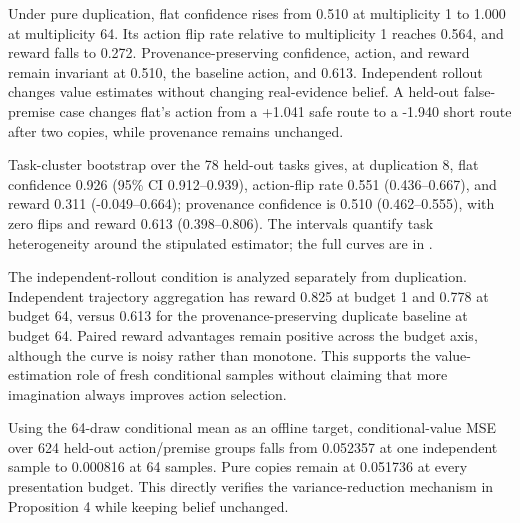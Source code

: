 \documentclass[10pt]{article}
\begin{document}
Under pure duplication, flat confidence rises from 0.510 at multiplicity 1 to 1.000 at multiplicity 64. Its action flip rate relative to multiplicity 1 reaches 0.564, and reward falls to 0.272. Provenance-preserving confidence, action, and reward remain invariant at 0.510, the baseline action, and 0.613. Independent rollout changes value estimates without changing real-evidence belief. A held-out false-premise case changes flat's action from a +1.041 safe route to a -1.940 short route after two copies, while provenance remains unchanged.

Task-cluster bootstrap over the 78 held-out tasks gives, at duplication 8, flat confidence 0.926 (95\% CI 0.912--0.939), action-flip rate 0.551 (0.436--0.667), and reward 0.311 (-0.049--0.664); provenance confidence is 0.510 (0.462--0.555), with zero flips and reward 0.613 (0.398--0.806). The intervals quantify task heterogeneity around the stipulated estimator; the full curves are in \texttt{}.

The independent-rollout condition is analyzed separately from duplication. Independent trajectory aggregation has reward 0.825 at budget 1 and 0.778 at budget 64, versus 0.613 for the provenance-preserving duplicate baseline at budget 64. Paired reward advantages remain positive across the budget axis, although the curve is noisy rather than monotone. This supports the value-estimation role of fresh conditional samples without claiming that more imagination always improves action selection.

Using the 64-draw conditional mean as an offline target, conditional-value MSE over 624 held-out action/premise groups falls from 0.052357 at one independent sample to 0.000816 at 64 samples. Pure copies remain at 0.051736 at every presentation budget. This directly verifies the variance-reduction mechanism in Proposition 4 while keeping belief unchanged.
\end{document}
